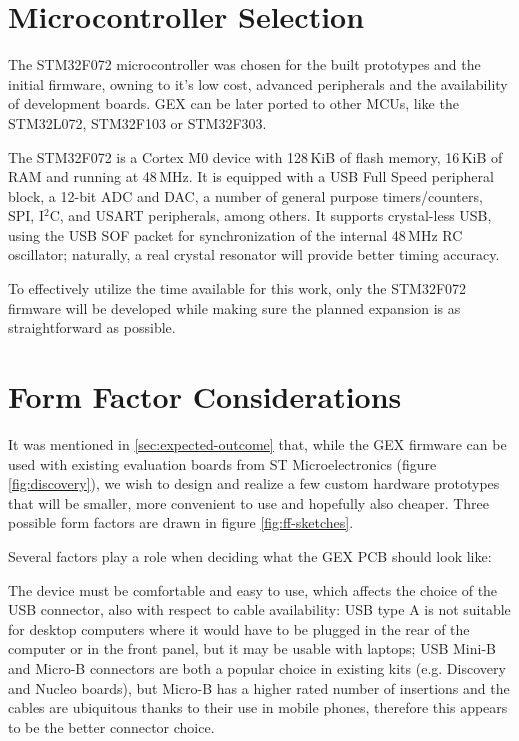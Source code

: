 \section{Microcontroller Selection}

The STM32F072 microcontroller was chosen for the built prototypes and the initial firmware, owning to it's low cost, advanced peripherals and the availability of development boards. GEX can be later ported to other MCUs, like the STM32L072, STM32F103 or STM32F303. 

The STM32F072 is a Cortex M0 device with 128\,KiB of flash memory, 16\,KiB of RAM and running at 48\,MHz. It is equipped with a USB Full Speed peripheral block, a 12-bit ADC and DAC, a number of general purpose timers/counters, SPI, I$^2$C, and USART peripherals, among others. It supports crystal-less USB, using the USB SOF packet for synchronization of the internal 48\,MHz RC oscillator; naturally, a real crystal resonator will provide better timing accuracy.

To effectively utilize the time available for this work, only the STM32F072 firmware will be developed while making sure the planned expansion is as straightforward as possible.

\section{Form Factor Considerations}

It was mentioned in \ref{sec:expected-outcome} that, while the GEX firmware can be used with existing evaluation boards from ST Microelectronics (figure \ref{fig:discovery}), we wish to design and realize a few custom hardware prototypes that will be smaller, more convenient to use and hopefully also cheaper. Three possible form factors are drawn in figure \ref{fig:ff-sketches}.

Several factors play a role when deciding what the GEX PCB should look like:

The device must be comfortable and easy to use, which affects the choice of the USB connector, also with respect to cable availability: USB type A is not suitable for desktop computers where it would have to be plugged in the rear of the computer or in the front panel, but it may be usable with laptops; USB Mini-B and Micro-B connectors are both a popular choice in existing kits (e.g. Discovery and Nucleo boards), but Micro-B has a higher rated number of insertions and the cables are ubiquitous thanks to their use in mobile phones, therefore this appears to be the better connector choice. 

